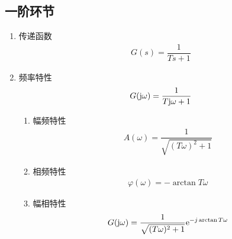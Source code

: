 \subsection{一阶环节}
\begin{enumerate}[1.]
	\item 传递函数
	\vspace*{-0.5em}
	\begin{align}
		G(s) = \dfrac{1}{Ts + 1}
	\end{align}
	\vspace*{-3em}
	
	\item 频率特性
	\vspace*{-0.5em}
	\begin{align}
		G(\text{j}  \omega) = \dfrac{1}{T \text{j} \omega + 1}
	\end{align}
	\vspace*{-3em}
	\begin{enumerate}[(1) ]
		\item 幅频特性
		\vspace*{-0.5em}
		\begin{align}
			A(\omega) = \dfrac{1}{\sqrt{(T\omega)^2 + 1}}
		\end{align}
		\vspace*{-3em}
		
		\item 相频特性
		\begin{align}
			\varphi(\omega) = -\arctan T\omega
		\end{align}
		\vspace*{-3em}
		
		\item 幅相特性
		\vspace*{-0.5em}
		\begin{align}
			G(\text{j} \omega) = \dfrac{1}{\sqrt{(T\omega)^2 + 1}} {\rm{e}}^{-j  \arctan T\omega}
		\end{align}
		\vspace*{-3em}
		

\end{enumerate}
\end{enumerate}

